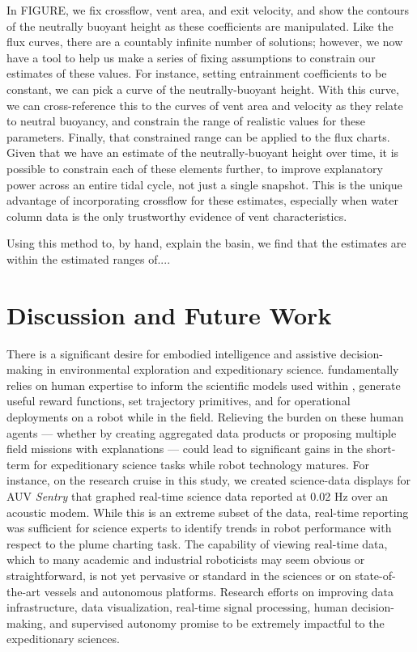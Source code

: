 In FIGURE, we fix crossflow, vent area, and exit velocity, and show the contours of the neutrally buoyant height as these coefficients are manipulated. Like the flux curves, there are a countably infinite number of solutions; however, we now have a tool to help us make a series of fixing assumptions to constrain our estimates of these values. For instance, setting entrainment coefficients to be constant, we can pick a curve of the neutrally-buoyant height. With this curve, we can cross-reference this to the curves of vent area and velocity as they relate to neutral buoyancy, and constrain the range of realistic values for these parameters. Finally, that constrained range can be applied to the flux charts. Given that we have an estimate of the neutrally-buoyant height over time, it is possible to constrain each of these elements further, to improve explanatory power across an entire tidal cycle, not just a single snapshot. This is the unique advantage of incorporating crossflow for these estimates, especially when water column data is the only trustworthy evidence of vent characteristics.

Using this method to, by hand, explain the basin, we find that the \PHUMES estimates are within the estimated ranges of....


\section{Discussion and Future Work}
\label{sec:future}
There is a significant desire for embodied intelligence and assistive decision-making in environmental exploration and expeditionary science. \PHORTEX fundamentally relies on human expertise to inform the scientific models used within \PHUMES, generate useful reward functions, set trajectory primitives, and for operational deployments on a robot while in the field. Relieving the burden on these human agents --- whether by creating aggregated data products or proposing multiple field missions with explanations --- could lead to significant gains in the short-term for expeditionary science tasks while robot technology matures. For instance, on the research cruise in this study, we created science-data displays for AUV \emph{Sentry} that graphed real-time science data reported at 0.02 Hz over an acoustic modem. While this is an extreme subset of the data, real-time reporting was sufficient for science experts to identify trends in robot performance with respect to the plume charting task. The capability of viewing real-time data, which to many academic and industrial roboticists may seem obvious or straightforward, is not yet pervasive or standard in the sciences or on state-of-the-art vessels and autonomous platforms. Research efforts on improving data infrastructure, data visualization, real-time signal processing, human decision-making, and supervised autonomy promise to be extremely impactful to the expeditionary sciences. 


